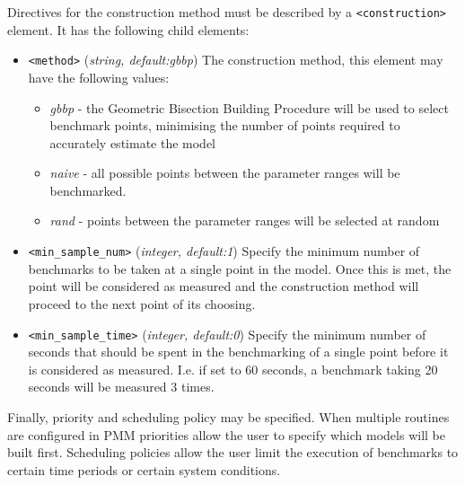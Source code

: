 \documentclass[a4paper,12pt]{report}
\begin{document}
    \noindent Directives for the construction method must be described by a
    \verb+<construction>+ element. It has the following child elements:
    \begin{itemize}
        \item \verb+<method>+ (\emph{string, default:gbbp}) The construction
            method, this element may have the following values:
        \begin{itemize}
            \item \emph{gbbp} - the Geometric Bisection Building Procedure will
                be used to select benchmark points, minimising the number of
                points required to accurately estimate the model
            \item \emph{naive} - all possible points between the parameter
                ranges will be benchmarked.
            \item \emph{rand} - points between the parameter ranges will be
                selected at random
        \end{itemize}
        \item \verb+<min_sample_num>+ (\emph{integer, default:1}) Specify the
            minimum number of benchmarks to be taken at a single point in the
            model. Once this is met, the point will be considered as measured
            and the construction method will proceed to the next point of its
            choosing.
        \item \verb+<min_sample_time>+ (\emph{integer, default:0}) Specify the
            minimum number of seconds that should be spent in the benchmarking
            of a single point before it is considered as measured. I.e. if set
            to 60 seconds, a benchmark taking 20 seconds will be measured 3
            times.
    \end{itemize}

    Finally, priority and scheduling policy may be specified. When multiple
    routines are configured in PMM priorities allow the user to specify which
    models will be built first. Scheduling policies allow the user limit the
    execution of benchmarks to certain time periods or certain system
    conditions.
\end{document}
